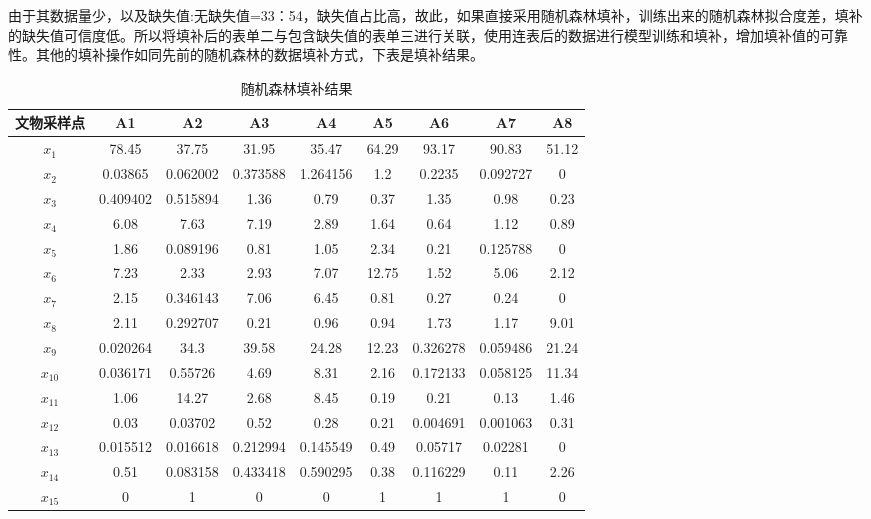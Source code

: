 \documentclass[UTF8]{ctexart}
\begin{document}
由于其数据量少，以及缺失值:无缺失值=33：54，缺失值占比高，故此，如果直接采用随机森林填补，训练出来的随机森林拟合度差，填补的缺失值可信度低。所以将填补后的表单二与包含缺失值的表单三进行关联，使用连表后的数据进行模型训练和填补，增加填补值的可靠性。其他的填补操作如同先前的随机森林的数据填补方式，下表是填补结果。

\begin{table}[H]
    \centering
    \caption{随机森林填补结果}
    \begin{tabular}{|c|c|c|c|c|c|c|c|c|}

        \hline
        文物采样点 & A1       & A2       & A3       & A4       & A5    & A6       & A7       & A8    \\ \hline
        $x_1$      & 78.45    & 37.75    & 31.95    & 35.47    & 64.29 & 93.17    & 90.83    & 51.12 \\ \hline
        $x_2$      & 0.03865  & 0.062002 & 0.373588 & 1.264156 & 1.2   & 0.2235   & 0.092727 & 0     \\ \hline
        $x_3$      & 0.409402 & 0.515894 & 1.36     & 0.79     & 0.37  & 1.35     & 0.98     & 0.23  \\ \hline
        $x_4$      & 6.08     & 7.63     & 7.19     & 2.89     & 1.64  & 0.64     & 1.12     & 0.89  \\ \hline
        $x_5$      & 1.86     & 0.089196 & 0.81     & 1.05     & 2.34  & 0.21     & 0.125788 & 0     \\ \hline
        $x_6$      & 7.23     & 2.33     & 2.93     & 7.07     & 12.75 & 1.52     & 5.06     & 2.12  \\ \hline
        $x_7$      & 2.15     & 0.346143 & 7.06     & 6.45     & 0.81  & 0.27     & 0.24     & 0     \\ \hline
        $x_8$      & 2.11     & 0.292707 & 0.21     & 0.96     & 0.94  & 1.73     & 1.17     & 9.01  \\ \hline
        $x_9 $     & 0.020264 & 34.3     & 39.58    & 24.28    & 12.23 & 0.326278 & 0.059486 & 21.24 \\ \hline
        $x_{10}$   & 0.036171 & 0.55726  & 4.69     & 8.31     & 2.16  & 0.172133 & 0.058125 & 11.34 \\ \hline
        $x_{11}$   & 1.06     & 14.27    & 2.68     & 8.45     & 0.19  & 0.21     & 0.13     & 1.46  \\ \hline
        $x_{12}$   & 0.03     & 0.03702  & 0.52     & 0.28     & 0.21  & 0.004691 & 0.001063 & 0.31  \\ \hline
        $x_{13}$   & 0.015512 & 0.016618 & 0.212994 & 0.145549 & 0.49  & 0.05717  & 0.02281  & 0     \\ \hline
        $x_{14}$   & 0.51     & 0.083158 & 0.433418 & 0.590295 & 0.38  & 0.116229 & 0.11     & 2.26  \\ \hline
        $x_{15}$   & 0        & 1        & 0        & 0        & 1     & 1        & 1        & 0     \\ \hline
    \end{tabular}
\end{table}
\end{document}
